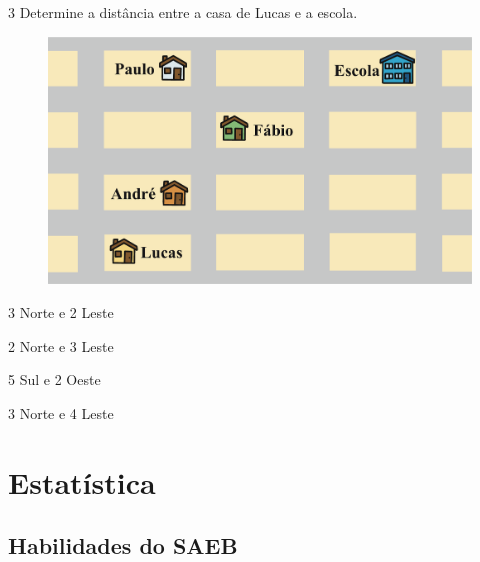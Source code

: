 \num{3} Determine a distância entre a casa de Lucas e a escola.

\begin{figure}[htpb!]
\centering
\includegraphics[width=\textwidth]{./ilustras-mat/modulo_12-treino_3.png}
\end{figure}

\begin{escolha}

  \item 3 Norte e 2 Leste

  \item 2 Norte e 3 Leste

  \item 5 Sul e 2 Oeste

  \item 3 Norte e 4 Leste

\end{escolha}


\chapter{Estatística}

\section*{Habilidades do SAEB}

